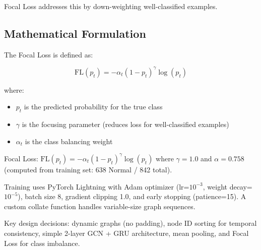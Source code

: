 Focal Loss addresses this by down-weighting well-classified examples.

\subsection{Mathematical Formulation}

The Focal Loss is defined as:

\begin{equation}
    \text{FL}(p_t) = -\alpha_t (1 - p_t)^\gamma \log(p_t)
\end{equation}

where:
\begin{itemize}
    \item $p_t$ is the predicted probability for the true class
    \item $\gamma$ is the focusing parameter (reduces loss for well-classified examples)
    \item $\alpha_t$ is the class balancing weight
\end{itemize}

Focal Loss: $\text{FL}(p_t) = -\alpha_t (1 - p_t)^\gamma \log(p_t)$ where $\gamma=1.0$ and $\alpha=0.758$ (computed from training set: 638 Normal / 842 total).

Training uses PyTorch Lightning with Adam optimizer (lr=$10^{-3}$, weight decay=$10^{-5}$), batch size 8, gradient clipping 1.0, and early stopping (patience=15). A custom collate function handles variable-size graph sequences.


Key design decisions: dynamic graphs (no padding), node ID sorting for temporal consistency, simple 2-layer GCN + GRU architecture, mean pooling, and Focal Loss for class imbalance.
